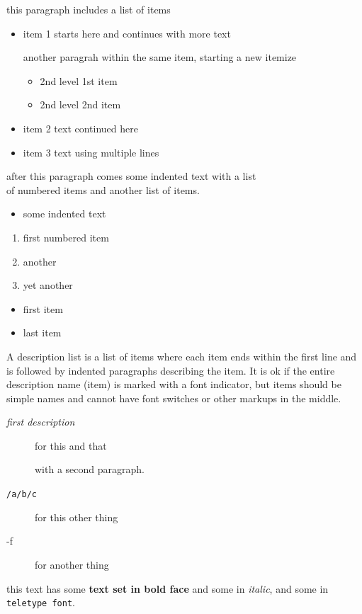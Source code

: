 \documentclass[a4paper]{article}
\begin{document}
this paragraph includes a list of items
\begin{itemize}

    \item item 1 starts here and continues with more text

    another paragrah within the same item, starting a new itemize
    \begin{itemize}

        \item 2nd level 1st item

        \item 2nd level 2nd item
    \end{itemize}

    \item item 2 text continued here

    \item item 3 text using multiple lines

\end{itemize}
after this paragraph comes some indented text with a list\\
of numbered items and another list of items.

\begin{itemize}
\item[]
    some indented text
\end{itemize}
\begin{enumerate}

    \item first numbered item

    \item another

    \item yet another
\end{enumerate}
\begin{itemize}

    \item first item

    \item last item

\end{itemize}
A description list is a list of items where each item ends within the
first line and is followed by indented paragraphs describing the item.
It is ok if the entire description name (item) is marked with a font
indicator, but items should be simple names and cannot have font
switches or other markups in the middle.
\begin{description}
    \item[\textit{first description}]
        for this and that

        with a second paragraph.

    \item[\texttt{/a/b/c}]
        for this other thing
    \item[-f]
        for another thing

\end{description}
this text has some \textbf{text set in bold face} and some in
\textit{italic}, and some in \texttt{teletype font}.
\end{document}

